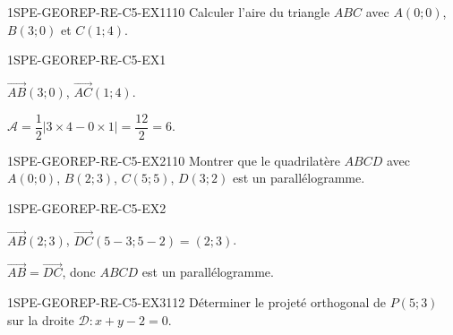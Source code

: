 

\begin{exercice}{1SPE-GEOREP-RE-C5-EX1}{1}{10}
Calculer l'aire du triangle $ABC$ avec $A(0 ; 0)$, $B(3 ; 0)$ et $C(1 ; 4)$.
\end{exercice}


\begin{corrige}{1SPE-GEOREP-RE-C5-EX1}

$\vec{AB}(3 ; 0)$, $\vec{AC}(1 ; 4)$.

$\mathcal{A} = \dfrac{1}{2}|3 \times 4 - 0 \times 1| = \dfrac{12}{2} = 6$.

\end{corrige}

\begin{exercice}{1SPE-GEOREP-RE-C5-EX2}{1}{10}
Montrer que le quadrilatère $ABCD$ avec $A(0 ; 0)$, $B(2 ; 3)$, $C(5 ; 5)$, $D(3 ; 2)$ est un parallélogramme.
\end{exercice}



\begin{corrige}{1SPE-GEOREP-RE-C5-EX2}

$\vec{AB}(2 ; 3)$, $\vec{DC}(5-3 ; 5-2) = (2 ; 3)$.

$\vec{AB} = \vec{DC}$, donc $ABCD$ est un parallélogramme.

\end{corrige}

\begin{exercice}{1SPE-GEOREP-RE-C5-EX3}{1}{12}
Déterminer le projeté orthogonal de $P(5 ; 3)$ sur la droite $\mathcal{D} : x + y - 2 = 0$.
\end{exercice}

